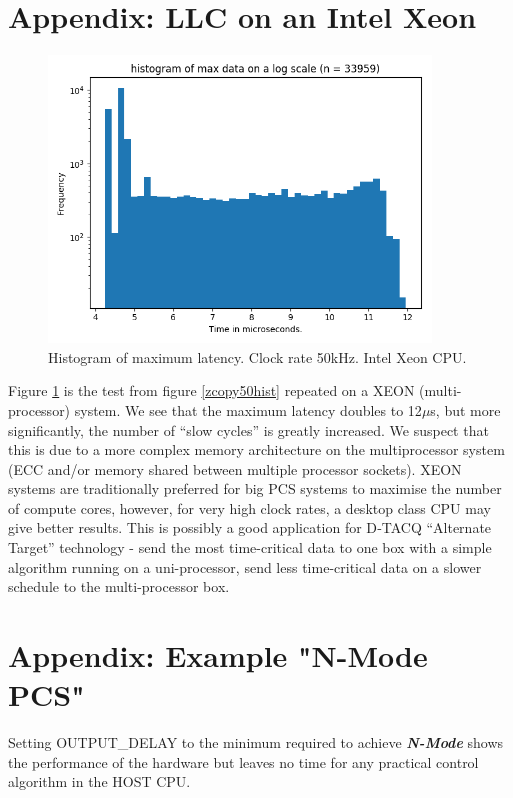 \documentclass{article}
\begin{document}
\section{Appendix: LLC on an Intel Xeon} \label{xeon}

\begin{figure}[!htb]
	\centering
	\includegraphics[width=4.0in]{images/50kHz_xeon.png}
	\caption{Histogram of maximum latency. Clock rate 50kHz. Intel Xeon CPU.}
	\label{xeon50}
\end{figure}

Figure \ref{xeon50} is the test from figure \ref{zcopy50hist} repeated on a XEON (multi-processor) system.
We see that the maximum latency doubles to 12$\mu$s, but more significantly, the number of “slow cycles” is greatly increased.
We suspect that this is due to a more complex memory architecture on the multiprocessor system (ECC and/or memory shared between multiple processor sockets).
XEON systems are traditionally preferred for big PCS systems to maximise the number of compute cores, however, for very high clock rates, a desktop class CPU may give better results.
This is possibly a good application for D‑TACQ “Alternate Target” technology - send the most time-critical data to one box with a simple algorithm running on a uni-processor, send less time-critical data on a slower schedule to the multi-processor box.

\section{Appendix: Example "N-Mode PCS"} \label{nmodepcs}

Setting OUTPUT\_DELAY to the minimum required to achieve \textit{\textbf{N-Mode}} shows the performance of the hardware but leaves no time for any practical control algorithm in the HOST CPU.
\end{document}
